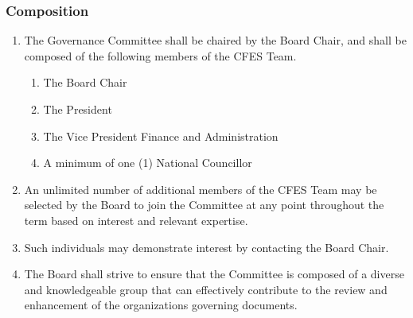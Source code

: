 \subsubsection{Composition}
\label{composition}

\begin{enumerate}
 \item
  The Governance Committee shall be chaired by the Board Chair, and shall be composed of the following members of the CFES Team.

  \begin{enumerate}
   \item
    The Board Chair
   \item
    The President
   \item
    The Vice President Finance and Administration
   \item
    A minimum of one (1) National Councillor
  \end{enumerate}

 \item
  An unlimited number of additional members of the CFES Team may be selected by the Board to join the Committee at any point throughout the term based on interest and relevant expertise.
 \item
  Such individuals may demonstrate interest by contacting the Board Chair.
 \item
  The Board shall strive to ensure that the Committee is composed of a diverse and knowledgeable group that can effectively contribute to the review and enhancement of the organization\textquotesingle s governing documents.
\end{enumerate}

